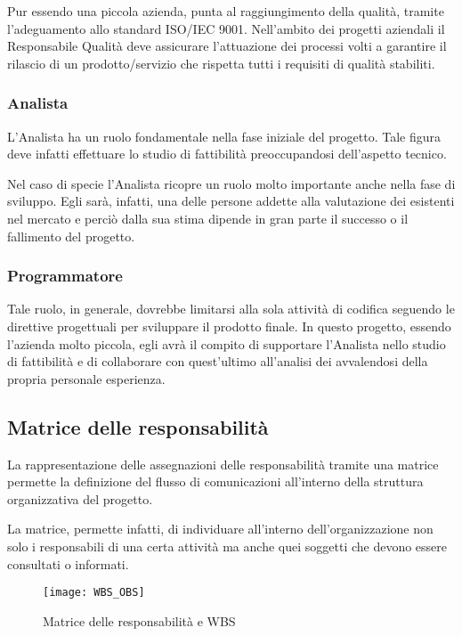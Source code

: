 Pur essendo una piccola azienda, \team punta al raggiungimento della qualità, tramite l'adeguamento allo standard ISO/IEC 9001.
Nell'ambito dei progetti aziendali il Responsabile Qualità deve assicurare l'attuazione dei processi volti a garantire il rilascio di un prodotto/servizio che rispetta tutti i requisiti di qualità stabiliti.
	 
\subsubsection{Analista}
	L'Analista ha un ruolo fondamentale nella fase iniziale del progetto. Tale figura deve infatti effettuare lo studio di fattibilità preoccupandosi dell'aspetto tecnico.

Nel caso di specie l'Analista ricopre un ruolo molto importante anche nella fase di sviluppo. Egli sarà, infatti, una delle persone addette alla valutazione dei  esistenti nel mercato e perciò  dalla sua stima dipende in gran parte il successo o il fallimento del progetto.

\subsubsection{Programmatore}
	 Tale ruolo, in generale, dovrebbe limitarsi alla sola attività di codifica seguendo le direttive progettuali per sviluppare il prodotto finale. In questo progetto, essendo l'azienda molto piccola, egli avrà il compito di supportare l'Analista nello studio di fattibilità e di collaborare con quest'ultimo all'analisi dei \sw avvalendosi della propria personale esperienza.

\subsection{Matrice delle responsabilità}
La rappresentazione delle assegnazioni delle responsabilità tramite una matrice permette la definizione del flusso di comunicazioni all'interno della struttura organizzativa del progetto.

La matrice, permette infatti, di individuare all'interno dell'organizzazione non solo i responsabili di una certa attività ma anche quei soggetti che devono essere consultati o informati.

\begin{figure}[!h]
  \texttt{[image: WBS\_OBS]}
	\caption{Matrice delle responsabilità e WBS}
	\label{fig:WBS_OBS}
\end{figure} 

